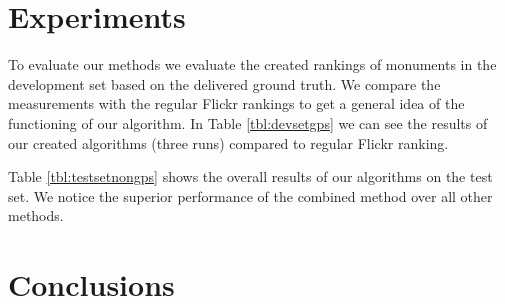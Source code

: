 \documentclass{acm_proc_article-me11_tweaked}
\begin{document}
\section{Experiments}
To evaluate our methods we evaluate the created rankings of monuments in the development set based on the delivered ground truth.
We compare the measurements with the regular Flickr rankings to get a general idea of the functioning of our algorithm.
In Table \ref{tbl:devsetgps} we can see the results of our created algorithms (three runs) compared to regular Flickr ranking.


Table \ref{tbl:testsetnongps} shows the overall results of our algorithms on the test set. We notice the superior performance of the combined method over all other methods.



\section{Conclusions}


%

\end{document}
